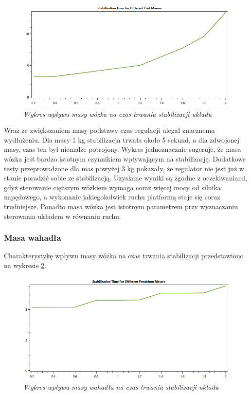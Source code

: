 \documentclass[12pt, oneside]{report}
\theoremstyle{definition}
\begin{document}
\begin{figure}[H]
	\centering
		\includegraphics[width = 350pt]{CartMassQuality} 
		\caption{\textit{Wykres wpływu masy wózka na czas trwania stabilizacji układu}}
		\label{plot:CartMassQuality}
\end{figure}

Wraz ze zwiększaniem masy podstawy czas regulacji ulegał znacznemu wydłużeniu. Dla masy 1 kg stabilizacja trwała około 5 sekund, a dla zdwojonej masy, czas ten był niemalże potrojony. Wykres jednoznacznie sugeruje, że masa wózka jest bardzo istotnym czynnikiem wpływającym na stabilizację. Dodatkowe testy przeprowadzone dla mas powyżej 3 kg pokazały, że regulator nie jest już w stanie poradzić sobie ze stabilizacją. Uzyskane wyniki są zgodne z oczekiwaniami, gdyż sterowanie cięższym wózkiem wymaga coraz więcej mocy od silnika napędowego, a wykonanie jakiegokolwiek ruchu platformą staje się coraz trudniejsze. Ponadto masa wózka jest istotnym parametrem przy wyznaczaniu sterowania układem w równaniu ruchu. 

\subsubsection{Masa wahadła}
Charakterystykę wpływu masy wózka na czas trwania stabilizacji przedstawiono na wykresie \ref{plot:PendulumMassQuality}.
\begin{figure}[H]
	\centering
		\includegraphics[width = 350pt]{PendulumMassQuality} 
		\caption{\textit{Wykres wpływu masy wahadła na czas trwania stabilizacji układu}}
		\label{plot:PendulumMassQuality}
\end{figure}
\end{document}
